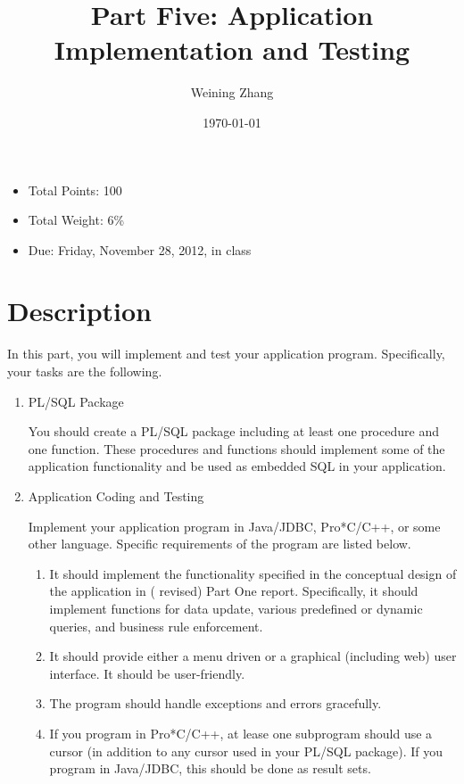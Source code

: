 \documentclass[11pt]{article}
\title{Part Five: Application Implementation and Testing}
\author{Weining Zhang}
\date{\today}
\begin{document}
\maketitle


\begin{itemize}
\item Total Points: 100
\item Total Weight: 6\%
\item Due: Friday, November 28, 2012, in class
\end{itemize}

\section*{Description}
\label{sec-1}


  In this part, you will implement and test your application
  program. Specifically, your tasks are the following.

\begin{enumerate}
\item PL/SQL Package
     
     You should create a PL/SQL package including at least one
     procedure and one function. These procedures and functions should
     implement some of the application functionality and be used as
     embedded SQL in your application.
\item Application Coding and Testing

     Implement your application program in Java/JDBC, Pro*C/C++, or
     some other language. Specific requirements of the program are
     listed below.
\begin{enumerate}
\item It should implement the functionality specified in the
        conceptual design of the application in ( revised) Part One
        report. Specifically, it should implement functions for data
        update, various predefined or dynamic queries, and business
        rule enforcement.
\item It should provide either a menu driven or a graphical
        (including web) user interface. It should be user-friendly.
\item The program should handle exceptions and errors gracefully.
\item If you program in Pro*C/C++, at lease one subprogram should
        use a cursor (in addition to any cursor used in your PL/SQL
        package). If you program in Java/JDBC, this should be done as
        result sets.
\end{enumerate}
\end{enumerate}
\end{document}
